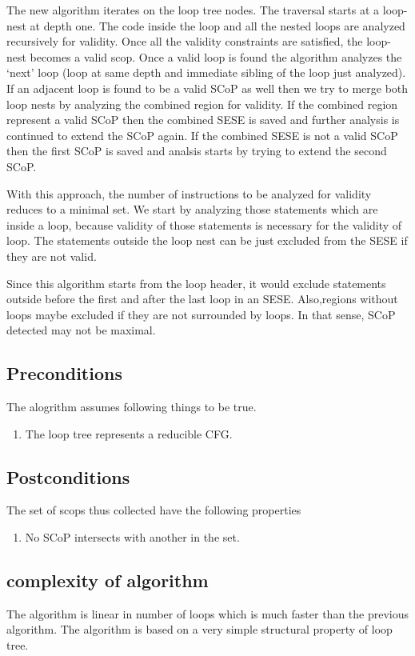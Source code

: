 \documentclass{sigplanconf}
\begin{document}
The new algorithm iterates on the loop tree nodes. The traversal starts at a loop-nest at depth one.
The code inside the loop and all the nested loops are analyzed recursively for validity. Once all the validity
constraints are satisfied, the loop-nest becomes a valid scop. Once a valid loop is found the algorithm analyzes the
`next' loop (loop at same depth and immediate sibling of the loop just analyzed). If an adjacent loop is found to be a
valid SCoP as well then we try to merge both loop nests by analyzing the combined region for validity. If the combined
region represent a valid SCoP then the combined SESE is saved and further analysis is continued to extend the SCoP
again. If the combined SESE is not a valid SCoP then the first SCoP is saved and analsis starts by trying to extend
the second SCoP.

With this approach, the number of instructions to be analyzed for validity reduces to a minimal set.
We start by analyzing those statements which are inside a loop, because validity of those statements is
necessary for the validity of loop. The statements outside the loop nest can be just excluded from the
SESE if they are not valid.

Since this algorithm starts from the loop header, it would exclude statements outside before the first and after the
last loop in an SESE. Also,regions without loops maybe excluded if they are not surrounded by loops.
In that sense, SCoP detected may not be maximal.

\subsection{Preconditions}
The alogrithm assumes following things to be true.
\begin{enumerate}
\item The loop tree represents a reducible CFG.
\end{enumerate}

\subsection{Postconditions}
The set of scops thus collected have the following properties
\begin{enumerate}
\item No SCoP intersects with another in the set.
\end{enumerate}

\subsection{complexity of algorithm}
The algorithm is linear in number of loops
which is much faster than the previous algorithm. The algorithm is based on a very simple structural property of loop
tree.
\end{document}
